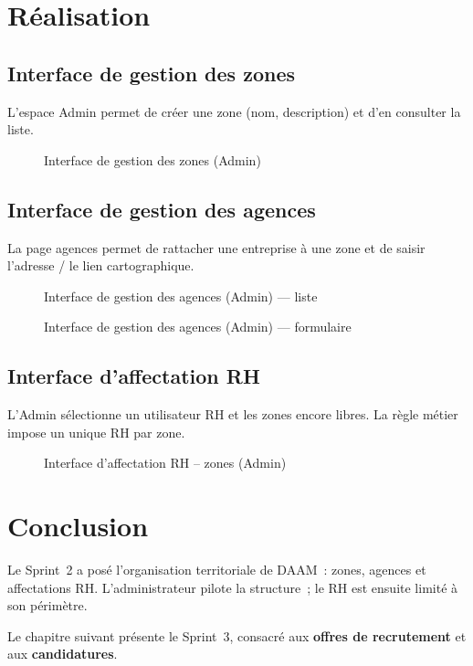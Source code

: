 \section{Réalisation}

\subsection{Interface de gestion des zones}

L'espace Admin permet de créer une zone (nom, description) et d'en
consulter la liste.

\begin{figure}[H]
  \centering
  \caption{Interface de gestion des zones (Admin)}
  \label{fig:ui-zones}
\end{figure}


\subsection{Interface de gestion des agences}

La page agences permet de rattacher une entreprise à une zone et de
saisir l'adresse / le lien cartographique.

\begin{figure}[H]
  \centering
  \caption{Interface de gestion des agences (Admin) --- liste}
  \label{fig:ui-companies}
\end{figure}

\begin{figure}[H]
  \centering
  \caption{Interface de gestion des agences (Admin) --- formulaire}
  \label{fig:ui-companies-form}
\end{figure}


\subsection{Interface d'affectation RH}

L'Admin sélectionne un utilisateur RH et les zones encore libres. La
règle métier impose un unique RH par zone.

\begin{figure}[H]
  \centering
  \caption{Interface d'affectation RH -- zones (Admin)}
  \label{fig:ui-rh-assign}
\end{figure}


\section{Conclusion}

Le Sprint~2 a posé l'organisation territoriale de DAAM~: zones, agences
et affectations RH. L'administrateur pilote la structure~; le RH est
ensuite limité à son périmètre.

Le chapitre suivant présente le Sprint~3, consacré aux
\textbf{offres de recrutement} et aux \textbf{candidatures}.

\clearpage